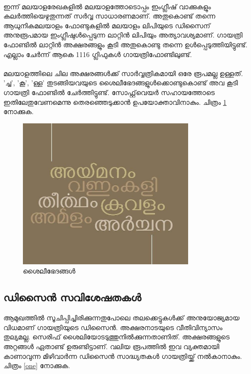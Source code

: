\documentclass[12pt]{article}
\begin{document}
	\paragraph{}
	ഇന്ന് മലയാളരേഖകളില്‍ മലയാളത്തോടൊപ്പം ഇംഗ്ലീഷ് വാക്കുകളും കലര്‍ത്തിയെഴുതുന്നത് സര്‍വ്വ സാധാരണമാണ്. അതുകൊണ്ട് തന്നെ ആധുനികമലയാളം ഫോണ്ടുകളില്‍ മലയാളം ലിപിയുടെ ഡിസൈന് അനുരൂപമായ ഇംഗ്ലീഷുള്‍പ്പെടുന്ന ലാറ്റിന്‍ ലിപിയും അത്യാവശ്യമാണ്. ഗായത്രി ഫോണ്ടില്‍ ലാറ്റിന്‍ അക്ഷരങ്ങളും കൂടി അതുകൊണ്ടു തന്നെ ഉള്‍പ്പെടുത്തിയിട്ടുണ്ട്.  എല്ലാം ചേര്‍ന്ന് ആകെ 1116 ഗ്ലിഫുകള്‍ ഗായത്രിഫോണ്ടിലുണ്ട്. 
	
	\paragraph{}
	മലയാളത്തിലെ ചില അക്ഷരങ്ങള്‍ക്ക് സാര്‍വ്വത്രികമായി ഒരേ രൂപമല്ല ഉള്ളത്. 'ച്ച', 'കൂ', 'ള്ള' തുടങ്ങിയവയുടെ ശൈലീഭേദങ്ങളുള്‍ക്കൊണ്ടുകൊണ്ട് അവ കൂടി ഗായത്രി ഫോണ്ടില്‍ ചേര്‍ത്തിട്ടുണ്ട്. സോഫ്റ്റ്‌വെയര്‍ സഹായത്തോടെ ഇതിലേതുവേണമെന്നു തെരഞ്ഞെടുക്കാന്‍ ഉപയോക്താവിനാകും. ചിത്രം \ref{style} നോക്കുക. 
	‍ 
	\begin{figure}
		\begin{centering}
			\includegraphics[width=0.8\textwidth]{style.jpg}
			\caption{ശൈലീഭേദങ്ങള്‍}
			\label{style}
		\end{centering}
	\end{figure}
	
	
	\subsection{ഡിസൈന്‍ സവിശേഷതകള്‍}
	
	ആമുഖത്തില്‍ സൂചിപ്പിച്ചിരിക്കുന്നതുപോലെ തലക്കെട്ടുകള്‍ക്ക് അനുയോജ്യമായ വിധമാണ് ഗായത്രിയുടെ ഡിസൈന്‍. അക്ഷരനാടയുടെ വീതിവിന്യാസം തുല്യമല്ല. സെരിഫ് ശൈലിയോടടുത്തുനില്‍ക്കുന്നതാണിത്. അക്ഷരങ്ങളുടെ അറ്റങ്ങള്‍ ഏതാണ്ട് ഉരുണ്ടിട്ടാണ്. വലിയ രൂപത്തില്‍ ഇവ വ്യക്തമായി കാണാവുന്ന മിഴിവാര്‍ന്ന ഡിസൈന്‍ സാദ്ധ്യതകള്‍ ഗായത്രിയ്ക്ക് നല്‍കാനാകും.  ചിത്രം \ref{one} നോക്കുക.
	
\end{document}
